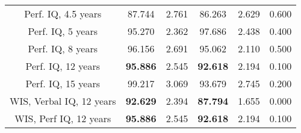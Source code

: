 \begin{longtable}{c c c c c c}
Perf. IQ, 4.5 years & 87.744 & 2.761 &  86.263 & 2.629 & 0.600 \\
Perf. IQ, 5 years & 95.270 & 2.362 &  97.686 & 2.438 & 0.400 \\
Perf. IQ, 8 years & 96.156 & 2.691 &  95.062 & 2.110 & 0.500 \\
Perf. IQ, 12 years & \textbf{95.886} & 2.545 &  \textbf{92.618} & 2.194 & 0.100 \\
Perf. IQ, 15 years & 99.217 & 3.069 &  93.679 & 2.745 & 0.200 \\
WIS, Verbal IQ, 12 years & \textbf{92.629} & 2.394 &  \textbf{87.794} & 1.655 & 0.000 \\
WIS, Perf IQ, 12 years & \textbf{95.886} & 2.545 &  \textbf{92.618} & 2.194 & 0.100 \\
\bottomrule
\end{longtable}
